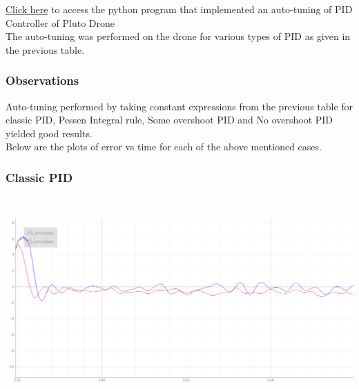 \documentclass[a4paper,12pt,oneside]{book}
\begin{document}
\href{https://github.com/eYSIP-2018/Autotuning-of-Controller-For-Drone/blob/6a7bdb9e7e259bd5313f333f7c46013b20c9bdca/auto-tuning-doc.py}{Click here} {to access the python program that implemented an auto-tuning of PID Controller of Pluto Drone} \\
The auto-tuning was performed on the drone for various types of PID as given in the previous table.

\subsubsection{Observations}
Auto-tuning performed by taking constant expressions from the previous table for classic PID, Pessen Integral rule, Some overshoot PID and No overshoot PID yielded good results.\\
Below are the plots of error vs time for each of the above mentioned cases.
 \subsubsection{Classic PID}
 \begin{flushleft}
\includegraphics[width = 15cm , height= 8cm]{extra-1.png}
\end{flushleft}
\end{document}
